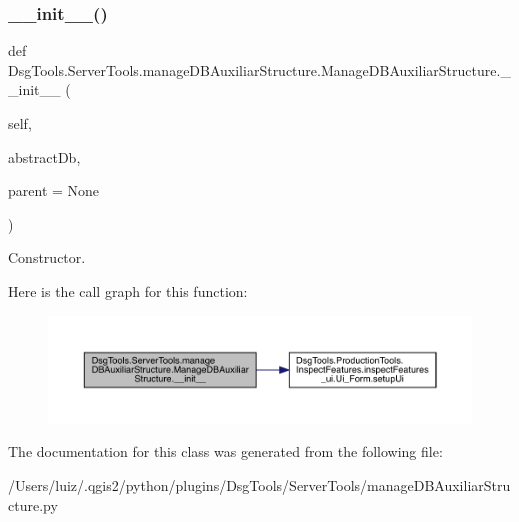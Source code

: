 \subsubsection{\texorpdfstring{\+\_\+\+\_\+init\+\_\+\+\_\+()}{\_\_init\_\_()}}
{\footnotesize\ttfamily def Dsg\+Tools.\+Server\+Tools.\+manage\+D\+B\+Auxiliar\+Structure.\+Manage\+D\+B\+Auxiliar\+Structure.\+\_\+\+\_\+init\+\_\+\+\_\+ (\begin{DoxyParamCaption}\item[{}]{self,  }\item[{}]{abstract\+Db,  }\item[{}]{parent = {\ttfamily None} }\end{DoxyParamCaption})}

\begin{DoxyVerb}Constructor.\end{DoxyVerb}
 Here is the call graph for this function\+:
\nopagebreak
\begin{figure}[H]
\begin{center}
\leavevmode
\includegraphics[width=350pt]{class_dsg_tools_1_1_server_tools_1_1manage_d_b_auxiliar_structure_1_1_manage_d_b_auxiliar_structure_a65251526e21b39dc5e30371df8c50bec_cgraph}
\end{center}
\end{figure}


The documentation for this class was generated from the following file\+:\begin{DoxyCompactItemize}
\item 
/\+Users/luiz/.\+qgis2/python/plugins/\+Dsg\+Tools/\+Server\+Tools/manage\+D\+B\+Auxiliar\+Structure.\+py\end{DoxyCompactItemize}
